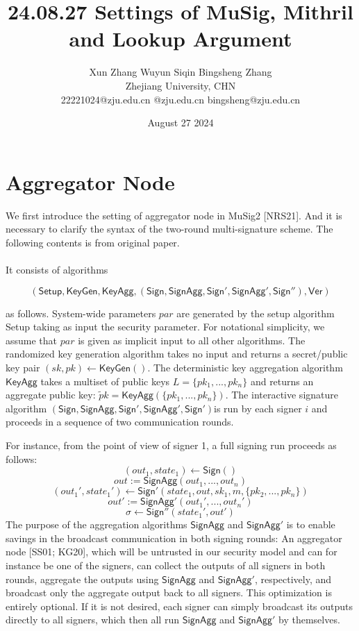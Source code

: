 \documentclass{article}
\title{24.08.27 Settings of MuSig, Mithril and Lookup Argument}
\author{Xun Zhang \quad \quad Wuyun Siqin \quad \quad Bingsheng Zhang \\ 
Zhejiang University, CHN \\
22221024@zju.edu.cn \quad 3210101763@zju.edu.cn \quad bingsheng@zju.edu.cn}
\date{August 27 2024}
\begin{document}
\maketitle

\section{Aggregator Node}

We first introduce the setting of aggregator node in MuSig2 [NRS21]. And it is necessary to clarify the syntax of the two-round multi-signature scheme. The following contents is from original paper.
\\
\\
It consists of algorithms

\[
\mathsf{(Setup,KeyGen,KeyAgg,(Sign, SignAgg, Sign', SignAgg', Sign''), Ver)}
\]

as follows. System-wide parameters $par$ are generated by the setup algorithm Setup taking as input the security parameter. For notational simplicity, we assume that $par$ is given as implicit input to all other algorithms. The randomized key generation algorithm takes no input and returns a secret/public key pair $(sk, pk) \leftarrow \mathsf{KeyGen()}$.
The deterministic key aggregation algorithm $\mathsf{KeyAgg}$ takes a multiset of public keys $L = \{pk_1,...,pk_n\}$ and returns an aggregate public key: $\tilde pk = \mathsf{KeyAgg}(\{pk_1,...,pk_n\})$.
The interactive signature algorithm $\mathsf{(Sign, SignAgg, Sign', SignAgg', Sign')} $is run by each signer $i$ and proceeds in a sequence of two communication rounds.

For instance, from the point of view of signer 1, a full signing run proceeds as follows:
\[
(out_1, state_1) \leftarrow \mathsf{Sign()}
\]
\[
 out := \mathsf{SignAgg}(out_1, . . . , out_n)
\]
\[
(out_1', state_1') \leftarrow \mathsf{Sign'}(state_1, out, sk_1, m, \{pk_2,...,pk_n\})
\]
\[
out':= \mathsf{SignAgg'}(out_1', . . . , out_n')
\]
\[
\sigma \leftarrow \mathsf{Sign''}(state_1', out')
\]
The purpose of the aggregation algorithms $\mathsf{SignAgg}$ and $\mathsf{SignAgg'}$ is to enable savings in the broadcast communication in both signing rounds: An aggregator node [SS01; KG20], which will be
untrusted in our security model and can for instance be one of the signers, can collect the outputs of all signers in both rounds, aggregate the outputs using $\mathsf{SignAgg}$ and $\mathsf{SignAgg'}$, respectively, and broadcast only the aggregate output back to all signers. This optimization is entirely optional. If it is not desired, each signer can simply broadcast its outputs directly to all signers, which then all run $\mathsf{SignAgg}$ and $\mathsf{SignAgg'}$ by themselves.
\end{document}
